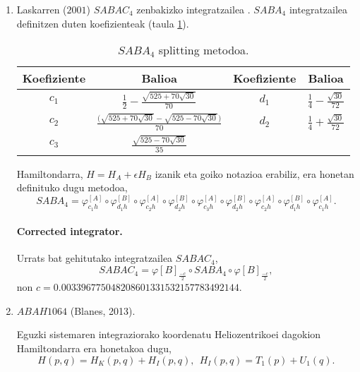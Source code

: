 \begin{enumerate}
\item Laskarren ($2001$) $SABAC_4$ zenbakizko integratzailea \cite{Laskar2001}.
$SABA_4$ integratzailea definitzen duten koefizienteak (taula \ref{tab:32}).
 
\begin{table}
\caption[$SABA_4$ splitting metodoa.] 
{\small{$SABA_4$ splitting metodoa.}}
\label{tab:32}       %
\begin{tabular}{ c c | c c} 
 \hline
 Koefiziente         &  Balioa  & Koefiziente         &  Balioa  \\
 \hline
 $c_1$ & $\frac{1}{2}-\frac{\sqrt{525+70\sqrt{30}}}{70}$ 
       & $d_1$ & $\frac{1}{4}-\frac{\sqrt{30}}{72}$\\
 $c_2$ & $\frac{\big( \sqrt{525+70 \sqrt{30}}-\sqrt{525-70 \sqrt{30}} \big)}{70}$ 
       & $d_2$ & $\frac{1}{4}+\frac{\sqrt{30}}{72}$\\
 $c_3$ & $\frac{\sqrt{525-70\sqrt{30}}}{35}$ & & \\
  \hline
 \end{tabular}
\end{table}

Hamiltondarra, $H=H_A+\epsilon H_B$ izanik eta goiko notazioa erabiliz, era honetan definituko dugu metodoa,
\begin{equation*}
SABA_4=\varphi^{[A]}_{c_1 h} \circ \varphi^{[B]}_{d_1 h} \circ \varphi^{[A]}_{c_2 h} \circ \varphi^{[B]}_{d_2 h}
         \circ  \varphi^{[A]}_{c_3 h}   \circ
          \varphi^{[B]}_{d_2 h} \circ \varphi^{[A]}_{c_2 h} \circ   \varphi^{[B]}_{d_1 h}\circ  \varphi^{[A]}_{c_1 h}.
\end{equation*}

\paragraph*{Corrected integrator.} Urrats bat gehitutako integratzailea $SABAC_4$,
\begin{equation*}
SABAC_4=\varphi{[B]}_\frac{-c}{2} \circ SABA_4 \circ \varphi{[B]}_\frac{-c}{2},
\end{equation*}
non $c=0.003396775048208601331532157783492144$.\\

\item $ABAH1064$ (Blanes, 2013).

Eguzki sistemaren integraziorako koordenatu Heliozentrikoei dagokion Hamiltondarra era honetakoa dugu,
\begin{equation*}
H(p,q)=H_K(p,q)+H_I(p,q), \ \ H_I(p,q)=T_1(p)+U_1(q). 
\end{equation*}


\end{enumerate}
